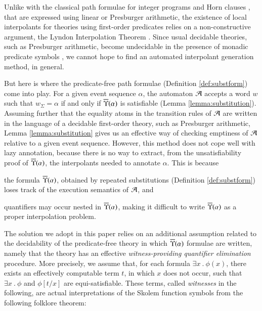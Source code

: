 \documentclass{llncs}
\begin{document}
Unlike with the classical path formulae for integer programs
\cite{McMillan06} and Horn clauses
\cite{BjornerGurfinkelMcMillanRybalchenko15}, that are expressed using
linear or Presburger arithmetic, the existence of local interpolants
for theories using first-order predicates relies on a non-constructive
argument, the Lyndon Interpolation Theorem \cite{Lyndon59}. Since
usual decidable theories, such as Presburger arithmetic, become
undecidable in the presence of monadic predicate symbols
\cite{Halpern91}, we cannot hope to find an automated interpolant
generation method, in general.

But here is where the predicate-free path formulae (Definition
\ref{def:substform}) come into play. For a given event sequence
$\alpha$, the automaton $\mathcal{A}$ accepts a word $w$ such that $w_\Sigma =
\alpha$ if and only if $\overline{\Upsilon}({\alpha})$ is satisfiable (Lemma
\ref{lemma:substitution}). Assuming further that the equality atoms in
the transition rules of $\mathcal{A}$ are written in the language of a
decidable first-order theory, such as Presburger arithmetic, Lemma
\ref{lemma:substitution} gives us an effective way of checking
emptiness of $\mathcal{A}$ relative to a given event sequence. However, this
method does not cope well with lazy annotation, because there is no
way to extract, from the unsatisfiability proof of
$\overline{\Upsilon}({\alpha})$, the interpolants needed to annotate
$\alpha$. This is because \begin{inparaenum}[(i)]
\item the formula $\overline{\Upsilon}({\alpha})$, obtained by repeated
  substitutions (Definition \ref{def:substform}) loses track of the
  execution semantics of $\mathcal{A}$, and 
%
\item quantifiers may occur nested in $\overline{\Upsilon}({\alpha})$, making it
  difficult to write $\overline{\Upsilon}({\alpha})$ as a proper interpolation
  problem.
\end{inparaenum}

The solution we adopt in this paper relies on an additional assumption
related to the decidability of the predicate-free theory in which
$\overline{\Upsilon}({\alpha})$ formulae are written, namely that the theory has
an effective \emph{witness-providing quantifier elimination}
procedure. More precisely, we assume that, for each formula $\exists x
~.~ \phi(x)$, there exists an effectively computable term $t$, in
which $x$ does not occur, such that $\exists x ~.~ \phi$ and
$\phi[t/x]$ are equi-satisfiable. These terms, called \emph{witnesses}
in the following, are actual interpretations of the Skolem function
symbols from the following folklore theorem:
\end{document}
